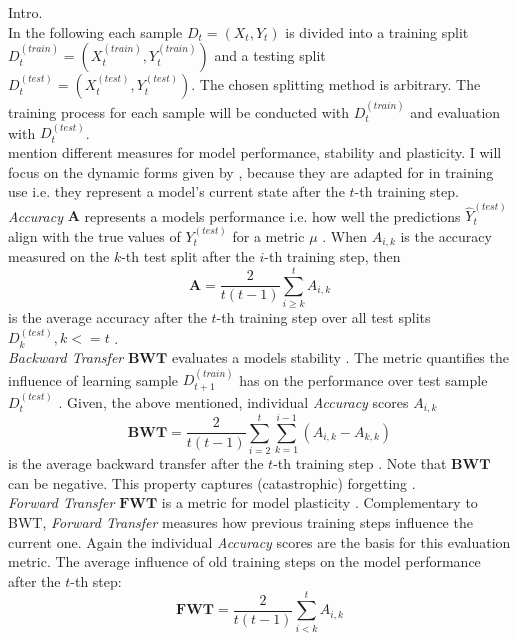 Intro.\\
In the following each sample $D_t = (X_t, Y_t)$ is divided into a training split $D_t^{(train)} = (X_t^{(train)}, Y_t^{(train)})$ and a testing split $D_t^{(test)} = (X_t^{(test)}, Y_t^{(test)})$. The chosen splitting method is arbitrary. The training process for each sample will be conducted with $D_t^{(train)}$ and evaluation with $D_t^{(test)}$.\\
\cite{LW} mention different measures for model performance, stability and plasticity. I will focus on the dynamic forms given by \cite{díazrodríguez2018dontforgetforgettingnew}, because they are adapted for in training use i.e. they represent a model's current state after the $t$-th training step.\\
\textit{Accuracy} $\mathbf{A}$ represents a models performance i.e. how well the predictions $\hat{Y}_t^{(test)}$ align with the true values of $Y_t^{(test)}$ for a metric $\mu$ . When $A_{i,k}$ is the accuracy measured on the $k$-th test split after the $i$-th training step, then
\begin{equation}
	\mathbf{A} = \frac{2}{t(t-1)}\sum_{i \geq k }^{t} A_{i,k}
\end{equation}
is the average accuracy after the $t$-th training step over all test splits $D_k^{(test)}, k <= t$ \cite{díazrodríguez2018dontforgetforgettingnew}.\\
\textit{Backward Transfer} $\mathbf{BWT}$ evaluates a models stability \cite{LW}. The metric quantifies the influence of learning sample $D_{t+1}^{(train)}$ has on the performance over test sample $D_t^{(test)}$ \cite{lopezpaz2022gradientepisodicmemorycontinual}. Given, the above mentioned, individual \textit{Accuracy} scores $A_{i,k}$
\begin{equation}
	\mathbf{BWT} = \frac{2}{t(t-1)} \sum_{i=2}^{t}\sum_{k=1}^{i-1}(A_{i,k}-A_{k,k})
\end{equation}
is the average backward transfer after the $t$-th training step \cite{díazrodríguez2018dontforgetforgettingnew}. Note that $\mathbf{BWT}$ can be negative. This property captures (catastrophic) forgetting \cite{LW}.\\
\textit{Forward Transfer} $\mathbf{FWT}$ is a metric for model plasticity \cite{LW}. Complementary to BWT, \textit{Forward Transfer} measures how previous training steps influence the current one. Again the individual \textit{Accuracy} scores are the basis for this evaluation metric. The average influence of old training steps on the model performance after the $t$-th step:
\begin{equation}
	\mathbf{FWT} = \frac{2}{t(t-1)}\sum_{i < k }^{t} A_{i,k}
\end{equation}
